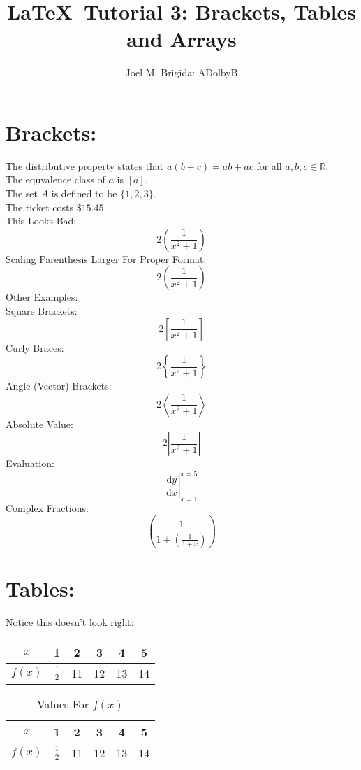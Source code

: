 \documentclass[11pt]{article} %
\begin{document}
\title{\LaTeX\ Tutorial 3: Brackets, Tables and Arrays}
\author{Joel M. Brigida: ADolbyB}
\maketitle %

\section{Brackets:}
\thispagestyle{empty} %

The distributive property states that $a(b+c) = ab + ac$ for all $a, b, c \in \mathbb{R}$.\\[6pt]
The equvalence class of $a$ is $[a]$.\\[6pt]
The set $A$ is defined to be $\{1, 2, 3\}$.\\[6pt]
The ticket costs $\$15.45$\\[6pt]
This Looks Bad: $$ 2(\frac{1}{x^2 +1}) $$
Scaling Parenthesis Larger For Proper Format: $$ 2\left(\frac{1}{x^2+1}\right) $$
Other Examples:\\[6pt]
Square Brackets:
$$ 2\left[\frac{1}{x^2+1}\right] $$
Curly Braces:
$$ 2\left\{\frac{1}{x^2+1}\right\} $$
Angle (Vector) Brackets:
$$ 2\left\langle\frac{1}{x^2+1}\right\rangle $$
Absolute Value:
$$ 2\left|\frac{1}{x^2+1}\right| $$
Evaluation:
$$ \left.\frac{\mathrm{d}y}{\mathrm{d}x}\right|_{x=1}^{x=5} $$
Complex Fractions:
$$ \left(\frac{1}{1 + \left(\frac{1}{1+x}\right)}\right) $$

\pagebreak

\section{Tables:}
Notice this doesn't look right:\\[6pt]
\begin{tabular}{|c||c|c|c|c|c|} %
    \hline
    $x$ & 1 & 2 & 3 & 4 & 5 \\ \hline
    $f(x)$ & $\frac{1}{2}$ & 11 & 12 & 13 & 14 \\ \hline
\end{tabular}

\vspace{1cm} %

\begin{table}[h!] %
\centering
\def\arraystretch{1.4}
\caption{Values For $f(x)$}
\begin{tabular}{|c||c|c|c|c|c|}
    \hline
    $x$ & 1 & 2 & 3 & 4 & 5 \\ \hline
    $f(x)$ & $\frac{1}{2}$ & 11 & 12 & 13 & 14 \\ \hline
\end{tabular}
\end{table}
\end{document}
